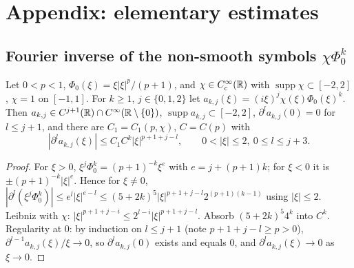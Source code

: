 \section{Appendix: elementary estimates}

\subsection{Fourier inverse of the non-smooth symbols $\chi\Phi_0^k$}

\begin{lemma}
  \label{lem:c03_nonsmooth_symbol_bounds}
  Let $0<p<1$, $\Phi_0(\xi)=\xi|\xi|^p/(p+1)$, and $\chi\in C_c^\infty(\mathbb{R})$ with $\operatorname{supp}\chi\subset[-2,2]$, $\chi=1$ on $[-1,1]$.
  For $k\ge1$, $j\in\{0,1,2\}$ let $a_{k,j}(\xi)=(i\xi)^j\chi(\xi)\Phi_0(\xi)^k$. Then $a_{k,j}\in C^{j+1}(\mathbb{R})\cap C^\infty(\mathbb{R}\setminus\{0\})$, $\operatorname{supp}a_{k,j}\subset[-2,2]$, $\partial^la_{k,j}(0)=0$ for $l\le j+1$, and
  there are $C_1=C_1(p,\chi)$, $C=C(p)$ with
  \[
    |\partial^la_{k,j}(\xi)|\le C_1C^k|\xi|^{p+1+j-l},\qquad 0<|\xi|\le2,\ 0\le l\le j+3 .
  \]
\end{lemma}
\begin{proof}
  For $\xi>0$, $\xi^j\Phi_0^k=(p+1)^{-k}\xi^{e}$ with $e=j+(p+1)k$; for $\xi<0$ it is $\pm(p+1)^{-k}|\xi|^e$. Hence for $\xi\ne0$,
  $|\partial^l(\xi^j\Phi_0^k)|\le e^l|\xi|^{e-l}\le(5+2k)^5|\xi|^{p+1+j-l}2^{(p+1)(k-1)}$ using $|\xi|\le2$.
  Leibniz with $\chi$: $|\xi|^{p+1+j-i}\le2^{l-i}|\xi|^{p+1+j-l}$. Absorb $(5+2k)^5 4^k$ into $C^k$.
  Regularity at $0$: by induction on $l\le j+1$ (note $p+1+j-l\ge p>0$), $\partial^{l-1}a_{k,j}(\xi)/\xi\to0$, so $\partial^la_{k,j}(0)$ exists and equals $0$, and $\partial^la_{k,j}(\xi)\to0$ as $\xi\to0$.
\end{proof}

